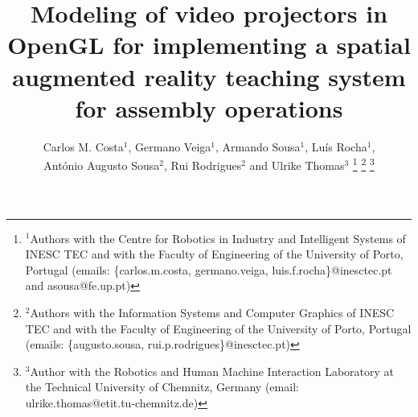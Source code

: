 









\title{\LARGE \bf
Modeling of video projectors in OpenGL for implementing a spatial augmented reality teaching system for assembly operations
}

\author{Carlos M. Costa$^{1}$, Germano Veiga$^{1}$, Armando Sousa$^{1}$, Luís Rocha$^{1}$,\\António Augusto Sousa$^{2}$, Rui Rodrigues$^{2}$ and Ulrike Thomas$^{3}$%
\thanks{$^{1}$Authors with the Centre for Robotics in Industry and Intelligent Systems of INESC TEC and with the Faculty of Engineering of the University of Porto, Portugal (emails: \{carlos.m.costa, germano.veiga, luis.f.rocha\}@inesctec.pt and asousa@fe.up.pt)}%
\thanks{$^{2}$Authors with the Information Systems and Computer Graphics of INESC TEC and with the Faculty of Engineering of the University of Porto, Portugal (emails: \{augusto.sousa, rui.p.rodrigues\}@inesctec.pt)}%
\thanks{$^{3}$Author with the Robotics and Human Machine Interaction Laboratory at the Technical University of Chemnitz, Germany (email: ulrike.thomas@etit.tu-chemnitz.de)}%
}


\maketitle



















